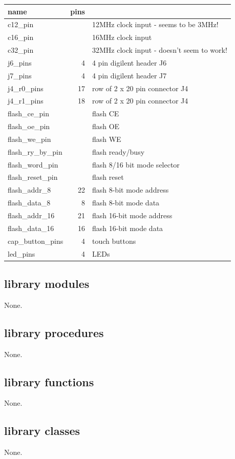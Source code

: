     \begin{tabular}{| l | r | l |}
    \hline
    name & pins & \\
    \hline
    \hline
    c12\_pin           &    & 12MHz clock input - seems to be 3MHz! \\ \hline
    c16\_pin           &    & 16MHz clock input \\ \hline
    c32\_pin           &    & 32MHz clock input - doesn't seem to work! \\ \hline
    j6\_pins           & 4  & 4 pin digilent header J6 \\ \hline
    j7\_pins           & 4  & 4 pin digilent header J7 \\ \hline
    j4\_r0\_pins       & 17 & row of 2 x 20 pin connector J4 \\ \hline
    j4\_r1\_pins       & 18 & row of 2 x 20 pin connector J4 \\ \hline
    flash\_ce\_pin     &    & flash CE \\ \hline
    flash\_oe\_pin     &    & flash OE \\ \hline
    flash\_we\_pin     &    & flash WE \\ \hline
    flash\_ry\_by\_pin &    & flash ready/busy \\ \hline
    flash\_word\_pin   &    & flash 8/16 bit mode selector \\ \hline
    flash\_reset\_pin  &    & flash reset \\ \hline
    flash\_addr\_8     & 22 & flash 8-bit mode address \\ \hline
    flash\_data\_8     & 8  & flash 8-bit mode data \\ \hline
    flash\_addr\_16    & 21 & flash 16-bit mode address \\ \hline
    flash\_data\_16    & 16 & flash 16-bit mode data \\ \hline
    cap\_button\_pins  & 4  & touch buttons \\ \hline
    led\_pins          & 4  & LEDs \\ \hline
    \end{tabular}




    \subsection{library modules}
    
        None.




    \subsection{library procedures}
    
        None.
        



    \subsection{library functions}
    
        None.


    \subsection{library classes}
    
        None.
